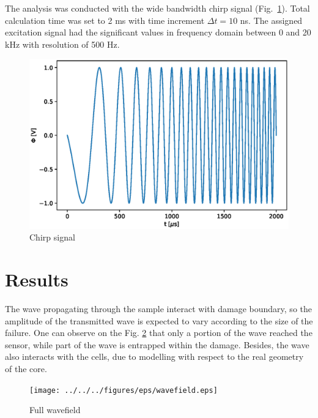 \documentclass[a4paper,12pt]{article}
\begin{document}
{The analysis was conducted with the wide bandwidth chirp signal (Fig.~\ref{fig:chirp}).
Total calculation time was set to 2 ms with time increment \(\Delta 
t=10\) ns.
The assigned excitation signal had the significant values in frequency domain between 0 and 20 kHz with resolution of 500 Hz.
\begin{figure}
	\begin{center}
		\includegraphics[width=1\linewidth]{../../../figures/eps/chirp_0_20.eps}
	\end{center}
	\caption{Chirp signal}
	\label{fig:chirp}
\end{figure}

\section{Results}
\label{sec:results}
The wave propagating through the sample interact with damage boundary, so the amplitude of the transmitted wave is expected to vary according to the size of the failure.
One can observe on the Fig. \ref{fig:wavefield} that only a portion of the wave reached the sensor, while part of the wave is entrapped within the damage. Besides, the wave also interacts with the cells, due to modelling with respect to the real geometry of the core.
\begin{figure}
	\begin{center}
		\texttt{[image: ../../../figures/eps/wavefield.eps]}
	\end{center}
	\caption{Full wavefield}
	\label{fig:wavefield}
\end{figure}

}
\end{document}
